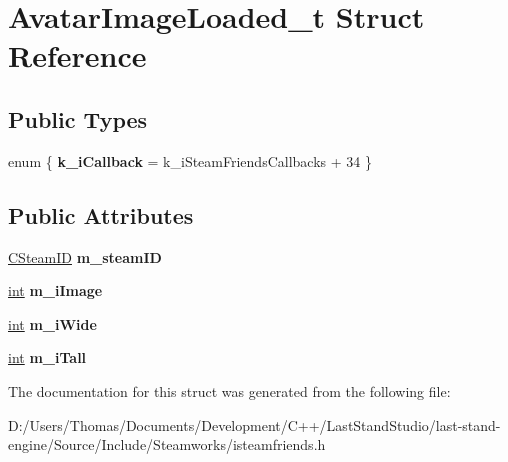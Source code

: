 \hypertarget{structAvatarImageLoaded__t}{}\section{Avatar\+Image\+Loaded\+\_\+t Struct Reference}
\label{structAvatarImageLoaded__t}
\subsection*{Public Types}
\begin{DoxyCompactItemize}
\item 
\hypertarget{structAvatarImageLoaded__t_ae8473e9d32a5422a6238b66ba79150a3}{}enum \{ {\bfseries k\+\_\+i\+Callback} = k\+\_\+i\+Steam\+Friends\+Callbacks + 34
 \}\label{structAvatarImageLoaded__t_ae8473e9d32a5422a6238b66ba79150a3}

\end{DoxyCompactItemize}
\subsection*{Public Attributes}
\begin{DoxyCompactItemize}
\item 
\hypertarget{structAvatarImageLoaded__t_aaf3357e7ba676fc550df84df4ad9c1d3}{}\hyperlink{classCSteamID}{C\+Steam\+I\+D} {\bfseries m\+\_\+steam\+I\+D}\label{structAvatarImageLoaded__t_aaf3357e7ba676fc550df84df4ad9c1d3}

\item 
\hypertarget{structAvatarImageLoaded__t_a0afad2841467161ace8f3c5cbd5fe000}{}\hyperlink{SDL__thread_8h_a6a64f9be4433e4de6e2f2f548cf3c08e}{int} {\bfseries m\+\_\+i\+Image}\label{structAvatarImageLoaded__t_a0afad2841467161ace8f3c5cbd5fe000}

\item 
\hypertarget{structAvatarImageLoaded__t_a05932408bc027edfd193a12cbf84a8e4}{}\hyperlink{SDL__thread_8h_a6a64f9be4433e4de6e2f2f548cf3c08e}{int} {\bfseries m\+\_\+i\+Wide}\label{structAvatarImageLoaded__t_a05932408bc027edfd193a12cbf84a8e4}

\item 
\hypertarget{structAvatarImageLoaded__t_ad454a0571dbfd5afbf2556c35d7d557f}{}\hyperlink{SDL__thread_8h_a6a64f9be4433e4de6e2f2f548cf3c08e}{int} {\bfseries m\+\_\+i\+Tall}\label{structAvatarImageLoaded__t_ad454a0571dbfd5afbf2556c35d7d557f}

\end{DoxyCompactItemize}


The documentation for this struct was generated from the following file\+:\begin{DoxyCompactItemize}
\item 
D\+:/\+Users/\+Thomas/\+Documents/\+Development/\+C++/\+Last\+Stand\+Studio/last-\/stand-\/engine/\+Source/\+Include/\+Steamworks/isteamfriends.\+h\end{DoxyCompactItemize}
